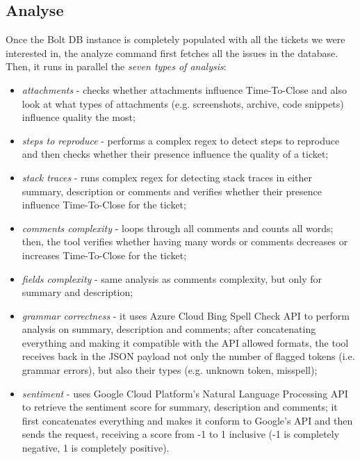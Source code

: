 \documentclass{mpaper}
\begin{document}
\subsection{Analyse}

Once the Bolt DB instance is completely populated with all the tickets we were interested in, the analyze command first 
fetches all the issues in the database. Then, it runs in parallel the \emph{seven types of analysis}:
\begin{itemize}
  \item \emph{attachments} - checks whether attachments influence Time-To-Close and also look at what types 
  of attachments (e.g. screenshots, archive, code snippets) influence quality the most;
  \item \emph{steps to reproduce} - performs a complex regex to detect steps to reproduce and then checks whether their presence
  influence the quality of a ticket;
  \item \emph{stack traces} - runs complex regex for detecting stack traces in either summary, description or comments 
  and verifies whether their presence influence Time-To-Close for the ticket;
  \item \emph{comments complexity} - loops through all comments and counts all words; then, the tool verifies whether 
  having many words or comments decreases or increases Time-To-Close for the ticket;
  \item \emph{fields complexity} - same analysis as comments complexity, but only for summary and description;
  \item \emph{grammar correctness} - it uses Azure Cloud Bing Spell Check API \cite{bing} to perform analysis on summary, 
  description and comments; after concatenating everything and making it compatible with the API allowed formats, the tool 
  receives back in the JSON payload not only the number of flagged tokens (i.e. grammar errors), but also their types 
  (e.g. unknown token, misspell);
  \item \emph{sentiment} - uses Google Cloud Platform's Natural Language Processing API \cite{gcp_nlp} to retrieve the 
  sentiment score for summary, description and comments; it first concatenates everything and makes it conform to Google's 
  API and then sends the request, receiving a score from -1 to 1 inclusive (-1 is completely negative, 1 is completely 
  positive).
\end{itemize}
\end{document}
